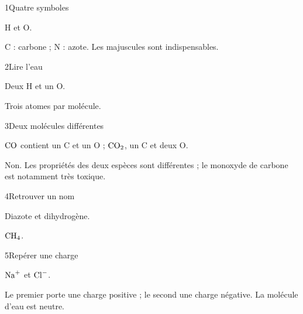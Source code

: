 \par\noindent\begin{minipage}{\linewidth}
\begin{corrige}{1}{Quatre symboles}
\begin{questions}
\item H et O.
\item C : carbone ; N : azote. Les majuscules sont indispensables.
\end{questions}
\end{corrige}
\end{minipage}
\par\noindent\begin{minipage}{\linewidth}
\begin{corrige}{2}{Lire l’eau}
\begin{questions}
\item Deux H et un O.
\item Trois atomes par molécule.
\end{questions}
\end{corrige}
\end{minipage}
\par\noindent\begin{minipage}{\linewidth}
\begin{corrige}{3}{Deux molécules différentes}
\begin{questions}
\item $\ce{CO}$ contient un C et un O ; $\ce{CO2}$, un C et deux O.
\item Non. Les propriétés des deux espèces sont différentes ; le monoxyde de carbone est notamment très toxique.
\end{questions}
\end{corrige}
\end{minipage}
\par\noindent\begin{minipage}{\linewidth}
\begin{corrige}{4}{Retrouver un nom}
\begin{questions}
\item Diazote et dihydrogène.
\item $\ce{CH4}$.
\end{questions}
\end{corrige}
\end{minipage}
\par\noindent\begin{minipage}{\linewidth}
\begin{corrige}{5}{Repérer une charge}
\begin{questions}
\item $\ce{Na+}$ et $\ce{Cl-}$.
\item Le premier porte une charge positive ; le second une charge négative. La molécule d’eau est neutre.
\end{questions}
\end{corrige}
\end{minipage}
